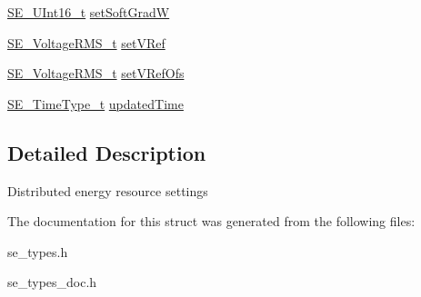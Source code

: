 \begin{DoxyCompactItemize}
\item 
\hyperlink{group__UInt16_gac68d541f189538bfd30cfaa712d20d29}{S\+E\+\_\+\+U\+Int16\+\_\+t} \hyperlink{group__DERSettings_gade867ee1fb03c1773130a0d9a5743584}{set\+Soft\+GradW}
\item 
\hyperlink{structSE__VoltageRMS__t}{S\+E\+\_\+\+Voltage\+R\+M\+S\+\_\+t} \hyperlink{group__DERSettings_gacd6deb80264d5c3dd884a43947686301}{set\+V\+Ref}
\item 
\hyperlink{structSE__VoltageRMS__t}{S\+E\+\_\+\+Voltage\+R\+M\+S\+\_\+t} \hyperlink{group__DERSettings_ga9b10fd8645e30e07ce49bda49d6cefc5}{set\+V\+Ref\+Ofs}
\item 
\hyperlink{group__TimeType_ga6fba87a5b57829b4ff3f0e7638156682}{S\+E\+\_\+\+Time\+Type\+\_\+t} \hyperlink{group__DERSettings_gabe364d4b64a470e7b43450c099bfeeb1}{updated\+Time}
\end{DoxyCompactItemize}


\subsection{Detailed Description}
Distributed energy resource settings 

The documentation for this struct was generated from the following files\+:\begin{DoxyCompactItemize}
\item 
se\+\_\+types.\+h\item 
se\+\_\+types\+\_\+doc.\+h\end{DoxyCompactItemize}
